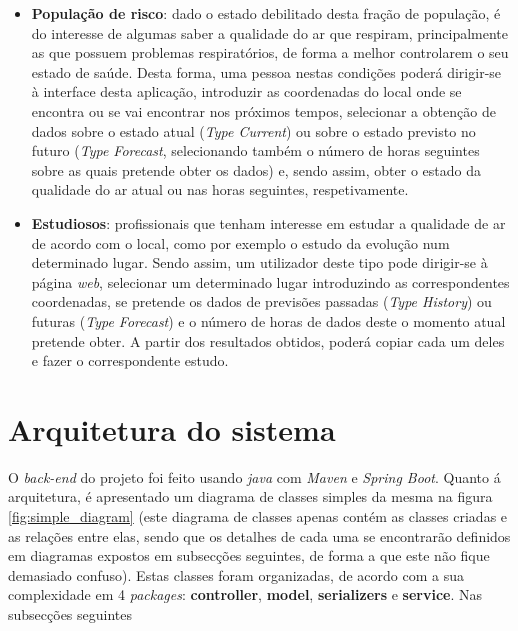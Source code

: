 \begin{itemize}
   \item \textbf{População de risco}: dado o estado debilitado desta fração de população, é do interesse 
de algumas saber a qualidade do ar que respiram, principalmente as que possuem problemas respiratórios, 
de forma a melhor controlarem o seu estado de saúde. Desta forma, uma pessoa nestas condições poderá dirigir-se
à interface desta aplicação, introduzir as coordenadas do local onde se encontra ou se vai encontrar nos próximos
tempos, selecionar a obtenção de dados sobre o estado atual (\textit{Type Current}) ou sobre o estado previsto no 
futuro (\textit{Type Forecast}, selecionando também o número de horas seguintes sobre as quais pretende obter os 
dados) e, sendo assim, obter o estado da qualidade do ar atual ou nas horas seguintes, respetivamente.
   \item \textbf{Estudiosos}: profissionais que tenham interesse em estudar a qualidade de ar de acordo com 
o local, como por exemplo o estudo da evolução num determinado lugar. Sendo assim, um utilizador deste tipo
pode dirigir-se à página \textit{web}, selecionar um determinado lugar introduzindo as correspondentes coordenadas,
se pretende os dados de previsões passadas (\textit{Type History}) ou futuras (\textit{Type Forecast}) e o 
número de horas de dados deste o momento atual pretende obter. A partir dos resultados obtidos, poderá copiar
cada um deles e fazer o correspondente estudo.
\end{itemize}

\section{Arquitetura do sistema}
O \textit{back-end} do projeto foi feito usando \textit{java} com \textit{Maven} e \textit{Spring Boot}.
Quanto á arquitetura, é apresentado um diagrama de classes simples da mesma na figura 
\ref{fig:simple_diagram} (este diagrama de classes apenas contém as classes criadas e as relações entre elas,
sendo que os detalhes de cada uma se encontrarão definidos em diagramas expostos em subsecções seguintes, 
de forma a que este não fique demasiado confuso). Estas classes foram organizadas, de acordo com 
a sua complexidade em 4 \textit{packages}: \textbf{controller}, \textbf{model}, \textbf{serializers} e 
\textbf{service}. Nas subsecções seguintes

